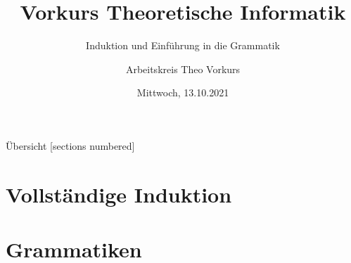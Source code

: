 %
%
%
%



\title{Vorkurs Theoretische Informatik}
\subtitle{Induktion und Einführung in die Grammatik}
\date{Mittwoch, 13.10.2021}
\author{Arbeitskreis Theo Vorkurs}



\maketitle

\begin{frame}[fragile]{Übersicht}
  [sections numbered]
  \tableofcontents%
\end{frame}

\section{Vollständige Induktion}









\section{Grammatiken}




